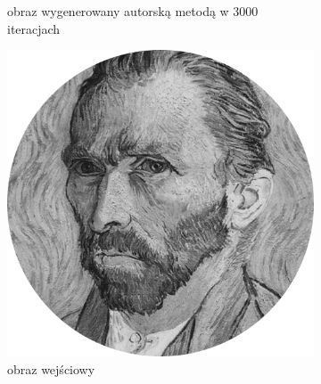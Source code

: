 \begin{figure}[H]
\begin{subfigure}{0.24\textwidth}
            \caption{obraz wygenerowany autorską metodą w 3000 iteracjach\\\hphantom{ }}
            \label{comp-comp-dufu-gogh-d}
        \end{subfigure}
        \begin{subfigure}{0.24\textwidth}
            \centering
            \includegraphics[width = \textwidth]{img/6-comp/gogh_original_c10_inv0.png}
            \caption{obraz wejściowy\\\hphantom{ }\\\hphantom{ }\\\hphantom{ }\\\hphantom{ }}
            \label{comp-comp-dufu-gogh-e}
        \end{subfigure}
        \begin{subfigure}{0.24\textwidth}
            \centering

\end{subfigure}
\end{figure}
